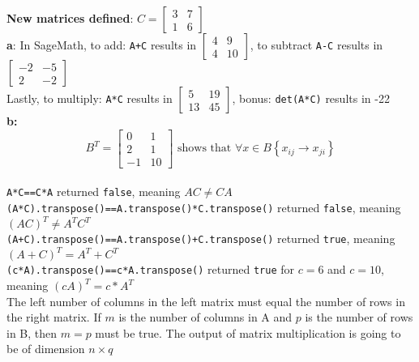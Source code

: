 \documentclass{article}
\begin{document}
\section{}
\textbf{New matrices defined}: $C=\begin{bmatrix}3 & 7 \\1 & 6\end{bmatrix}$
\\[0.05in]\textbf{a}: In SageMath, to add: \verb|A+C| results in $\begin{bmatrix}4 & 9 \\4 & 10\end{bmatrix}$, to subtract \verb|A-C| results in $\begin{bmatrix}-2 & -5 \\2 & -2\end{bmatrix}$
\\[0.05in]Lastly, to multiply: \verb|A*C| results in $\begin{bmatrix}5 & 19 \\13 & 45\end{bmatrix}$, bonus: \verb+det(A*C)+ results in -22
\\\textbf{b:} $$B^T=\begin{bmatrix}0 & 1 \\2 & 1 \\-1 & 10\end{bmatrix}\text{ shows that } \forall x \in B \left\{x_{ij} \rightarrow x_{ji} \right\} $$
\\[0.1in] \verb+A*C==C*A+ returned \verb+false+, meaning $AC\neq CA$
\\[0.1in] \verb+(A*C).transpose()==A.transpose()*C.transpose()+ returned \verb+false+, meaning $(AC)^T\neq A^TC^T$
\\[0.1in] \verb|(A+C).transpose()==A.transpose()+C.transpose()| returned \verb+true+, meaning $(A+C)^T=A^T+C^T$
\\[0.1in] \verb|(c*A).transpose()==c*A.transpose()| returned \verb|true| for $c=6$ and $c=10$, meaning $(cA)^T=c*A^T$
\\[0.1in] The left number of columns in the left matrix must equal the number of rows in the right matrix. If $m$ is the number of columns in A and $p$ is the number of rows in B, then $m=p$ must be true. The output of matrix multiplication is going to be of dimension $n \times q$
\end{document}
